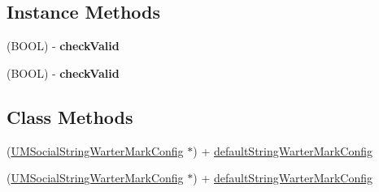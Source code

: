 \subsection*{Instance Methods}
\begin{DoxyCompactItemize}
\item 
\mbox{\label{interface_u_m_social_string_warter_mark_config_a1f380225bc9b043f46b02cb141662729}} 
(B\+O\+OL) -\/ {\bfseries check\+Valid}
\item 
\mbox{\label{interface_u_m_social_string_warter_mark_config_a1f380225bc9b043f46b02cb141662729}} 
(B\+O\+OL) -\/ {\bfseries check\+Valid}
\end{DoxyCompactItemize}
\subsection*{Class Methods}
\begin{DoxyCompactItemize}
\item 
(\mbox{\hyperlink{interface_u_m_social_string_warter_mark_config}{U\+M\+Social\+String\+Warter\+Mark\+Config}} $\ast$) + \mbox{\hyperlink{interface_u_m_social_string_warter_mark_config_a7284dde6cdcdaf49bf461e37012a1014}{default\+String\+Warter\+Mark\+Config}}
\item 
(\mbox{\hyperlink{interface_u_m_social_string_warter_mark_config}{U\+M\+Social\+String\+Warter\+Mark\+Config}} $\ast$) + \mbox{\hyperlink{interface_u_m_social_string_warter_mark_config_a7284dde6cdcdaf49bf461e37012a1014}{default\+String\+Warter\+Mark\+Config}}
\end{DoxyCompactItemize}
